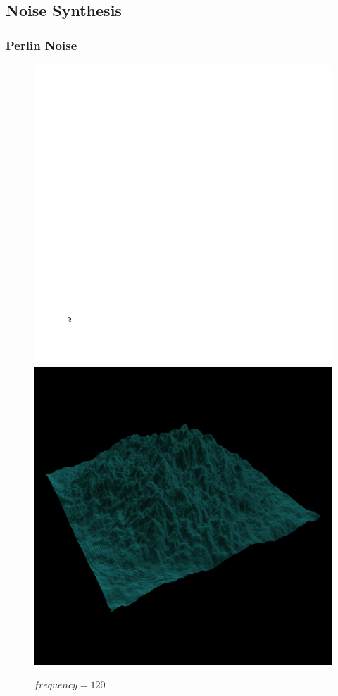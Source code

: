    \subsection{Noise Synthesis}
      
      \subsubsection{Perlin Noise}
      
   		\begin{figure}[H]
  			\centering
  			\includegraphics[width=\imagewidth]{images/results/terrains/512-1/perlin/120}
  			\includegraphics[width=\imagewidth]{images/results/terrains/512-1/perlin/120_3d}
  			\caption{$frequency = 120$}
  			\label{fig:ex-perlin120-surface}
   		\end{figure}
   		
